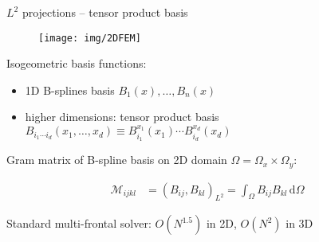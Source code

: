 \documentclass[c]{beamer}
\newcommand{\Prod}[2]{(#1, #2)_{L^2}}
\begin{document}
\begin{frame}{$L^2$ projections -- tensor product basis}

\begin{figure}
  \centering
  \texttt{[image: img/2DFEM]}
\end{figure}

Isogeometric basis functions:
\begin{itemize}
  \item 1D B-splines basis $B_1(x),\ldots, B_n(x)$
  \item higher dimensions: tensor product basis\\
        $B_{i_1\cdots i_d}(x_1,\ldots,x_d)
        \equiv B^{x_1}_{i_1}(x_1)\cdots B^{x_d}_{i_d}(x_d)$ \\
\end{itemize}
Gram matrix of B-spline basis on 2D domain $\Omega = \Omega_x \times \Omega_y$:

\begin{equation*}
  \begin{aligned}
  \mathcal{M}_{ijkl} &=
  \Prod{B_{ij}}{B_{kl}} =
  \int_\Omega B_{ij}B_{kl}\,\mbox{d}\Omega 
  \end{aligned}
\end{equation*}

Standard multi-frontal solver: $O(N^{1.5})$ in 2D, $O(N^2)$ in 3D

\end{frame}

\end{document}
